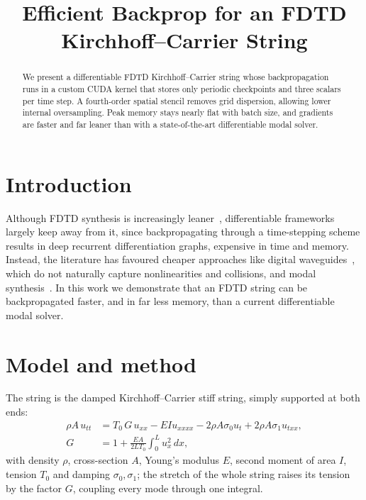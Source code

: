\documentclass[a4paper]{article}
\title{Efficient Backprop for an FDTD Kirchhoff--Carrier String}
\providecommand{\bstctlentry}[1]{\nocite{#1}}
\begin{document}
\bstctlentry{BSTcontrol}
\ninept
\maketitle
\begin{sloppy}
\begin{abstract}
We present a differentiable FDTD Kirchhoff--Carrier string whose
backpropagation runs in a custom CUDA kernel that stores only periodic
checkpoints and three scalars per time step. A fourth-order spatial stencil
removes grid dispersion, allowing lower internal oversampling. Peak memory
stays nearly flat with batch size, and gradients are faster and far leaner
than with a state-of-the-art differentiable modal solver.
\end{abstract}

\section{Introduction}
Although FDTD synthesis is increasingly leaner~\cite{bilbao2024guitar},
differentiable frameworks~\cite{engel2020ddsp} largely keep away from it,
since backpropagating through a time-stepping scheme results in deep
recurrent differentiation graphs, expensive in time and memory. Instead, the
literature has favoured cheaper approaches like digital
waveguides~\cite{tablas2026waveguides,tablas2026sound}, which do not
naturally capture nonlinearities and collisions, and modal
synthesis~\cite{diaz2025}. In this work we demonstrate that an FDTD string
can be backpropagated faster, and in far less memory, than a current
differentiable modal solver.

\section{Model and method}
The string is the damped Kirchhoff--Carrier stiff string, simply supported at
both ends:
\begin{equation}
\begin{aligned}
\rho A\,u_{tt}&=T_0\,G\,u_{xx}-EIu_{xxxx}-2\rho A\sigma_0u_t+2\rho A\sigma_1u_{txx},\\
G&=1+\frac{EA}{2LT_0}\int_0^L\!u_x^2\,dx,
\end{aligned}
\label{eq:pde}
\end{equation}
with density $\rho$, cross-section $A$, Young's modulus $E$, second moment of
area $I$, tension $T_0$ and damping $\sigma_0,\sigma_1$; the stretch of the whole
string raises its tension by the factor $G$, coupling every mode through one
integral.


\end{sloppy}
\end{document}
